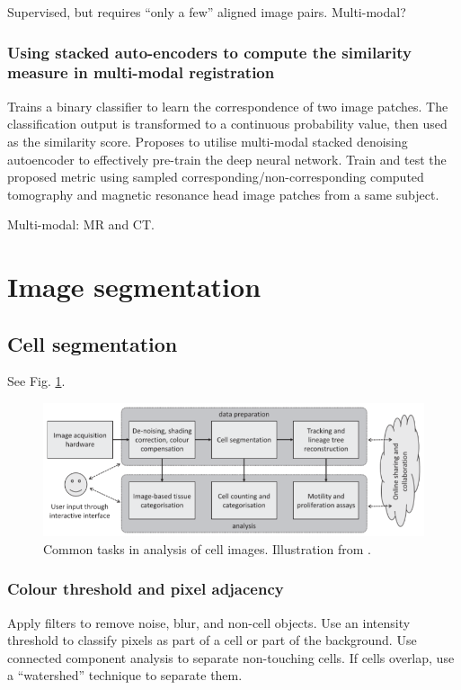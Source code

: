 \documentclass[11pt]{article} %
\begin{document}
Supervised, but requires ``only a few'' aligned image pairs. Multi-modal?

    \subsubsection{Using stacked auto-encoders to compute the similarity measure in multi-modal registration \cite{cheng:deepsimilarity}}
Trains a binary classifier to learn the correspondence of two image patches. The classification output is transformed to a continuous probability value, then used as the similarity score. Proposes to utilise multi-modal stacked denoising autoencoder to effectively pre-train the deep neural network. Train and test the proposed metric using sampled corresponding/non-corresponding computed tomography and magnetic resonance head image patches from a same subject.

Multi-modal: MR and CT.

\section{Image segmentation}
\subsection{Cell segmentation}
See Fig. \ref{fig:cells}.
\begin{figure}[h!]
  \centering
  \includegraphics[width= \linewidth]{cells.png}
  \caption{Common tasks in analysis of cell images. Illustration from \cite{kan:machine}.}
  \label{fig:cells}
\end{figure}
    \subsubsection{Colour threshold and pixel adjacency}
Apply filters to remove noise, blur, and non-cell objects. Use an intensity threshold to classify pixels as part of a cell or part of the background. Use connected component analysis to separate non-touching cells. If cells overlap, use a ``watershed'' technique to separate them.
\end{document}
